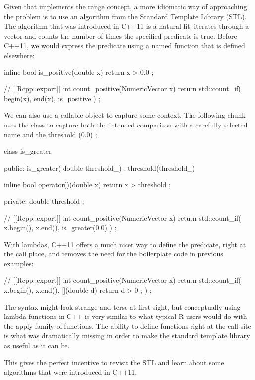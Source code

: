 Given that  implements the range concept, a more idiomatic
way of approaching the problem is to use an algorithm from the Standard
Template Library (STL). The  algorithm that was introduced
in C++11 is a natural fit:  iterates through a vector
and counts the number of times the specified predicate is true. Before C++11,
we would express the predicate using a named function that is defined
elsewhere:

\begin{example}
inline bool is_positive(double x){
  return x > 0.0 ;
}

// [[Rcpp::export]]
int count_positive(NumericVector x){
  return std::count_if( begin(x), end(x), is_positive ) ;
}
\end{example}

We can also use a callable object to capture some context. The
following chunk uses the  class to capture both the
intended comparison with a carefully selected name and the threshold (0.0) ;

\begin{example}
class is_greater {
public:
  is_greater( double threshold_) : threshold(threshold_){}

  inline bool operator()(double x){
    return x > threshold ;
  }

private:
  double threshold ;
}
// [[Rcpp::export]]
int count_positive(NumericVector x){
  return std::count_if( x.begin(), x.end(), is_greater(0.0) ) ;
}
\end{example}

With lambdas, C++11 offers a much nicer way to define the predicate, right at the
call place, and removes the need for the boilerplate code in previous examples:

\begin{example}
// [[Rcpp::export]]
int count_positive(NumericVector x){
  return std::count_if( x.begin(), x.end(),
    [](double d){ return d > 0 ;}
  ) ;
}
\end{example}

The syntax might look strange and terse at first sight, but conceptually
using lambda functions in C++ is very similar to what typical R users
would do with the apply family of functions. The ability to define
functions right at the call site is what was dramatically missing in order
to make the standard template library as useful as it can be.

This gives the perfect incentive to revisit the STL and learn about some
algorithms that were introduced in C++11.

